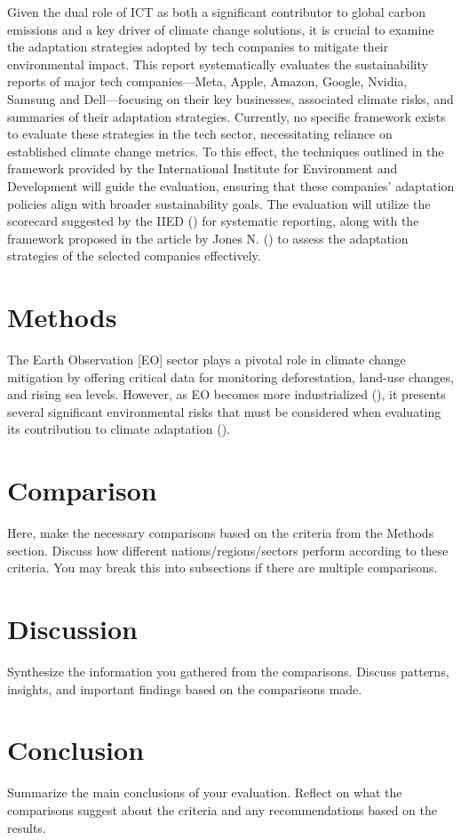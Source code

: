 \documentclass[12pt]{article}
\begin{document}
Given the dual role of ICT as both a significant contributor to global carbon emissions and a 
key driver of climate change solutions, it is crucial to examine the adaptation strategies 
adopted by tech companies to mitigate their environmental impact. This report systematically 
evaluates the sustainability reports of major tech companies—Meta, Apple, Amazon, Google, Nvidia, 
Samsung and Dell—focusing on their key businesses, associated climate risks, and summaries of 
their adaptation strategies. Currently, no specific 
framework exists to evaluate these strategies in the tech sector, necessitating reliance on established climate change 
metrics. To this effect, the techniques outlined in the framework provided by the International Institute for Environment and Development will guide the evaluation, ensuring that these companies’ adaptation policies align with broader sustainability goals. The evaluation will utilize the scorecard suggested by the IIED (\cite{craft_2016}) for systematic reporting, along with the framework proposed in the article by Jones N. (\cite{jones_2001}) 
to assess the adaptation strategies of the selected companies effectively.


\section*{Methods}
The Earth Observation [EO] sector plays a pivotal role in climate change mitigation by offering critical 
data for monitoring deforestation, land-use changes, and rising sea levels. However, as EO becomes more industrialized (\cite{venkatesan_2020}), 
it presents several significant environmental risks that must be considered when evaluating its contribution to climate adaptation (\cite{crisp_2020}).

\section*{Comparison}
Here, make the necessary comparisons based on the criteria from the Methods section. Discuss how different nations/regions/sectors perform according to these criteria. You may break this into subsections if there are multiple comparisons.

\section*{Discussion}
Synthesize the information you gathered from the comparisons. Discuss patterns, insights, and important findings based on the comparisons made.

\section*{Conclusion}
Summarize the main conclusions of your evaluation. Reflect on what the comparisons suggest about the criteria and any recommendations based on the results.

\newpage
\printbibliography
\end{document}
